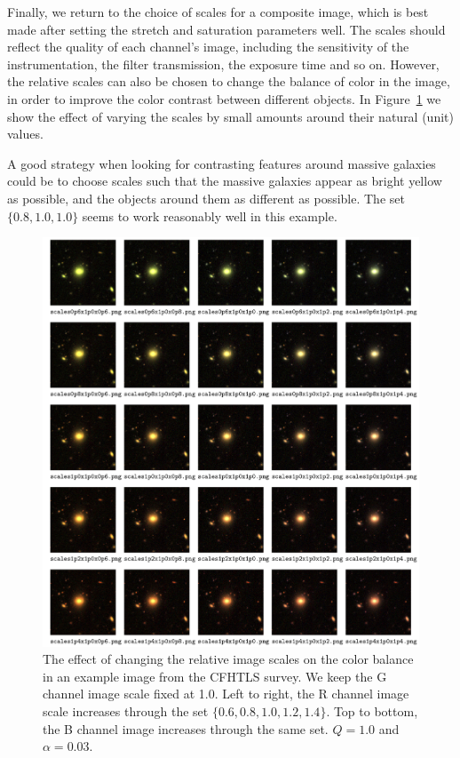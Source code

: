 \documentclass[letterpaper, 11pt]{article}
\begin{document}
Finally, we return to the choice of scales for a composite image, which is
best made after setting the stretch and saturation parameters well. The
scales should reflect the quality of each channel's image, including
the sensitivity of the instrumentation, the filter transmission, the exposure
time and so on. However, the relative scales can also be chosen to change the
balance of color in the image, in order to improve the color contrast between
different objects. In Figure~\ref{fig:color} we show the effect of varying the
scales by small amounts around their natural (unit) values.

A good strategy when looking for contrasting features around massive galaxies
could be to choose scales such that the massive galaxies appear as bright
yellow as possible, and the objects around them as different as possible. The
set $\{0.8,1.0,1.0\}$ seems to work reasonably well in this example.

\begin{figure}
\centering\includegraphics[width=0.9\linewidth]{Images/CFHTLS_27_scales_gallery.png}
\caption{The effect of changing the relative image scales on the color balance
in an example image from the CFHTLS survey. We keep the G channel image scale
fixed at 1.0. Left to right, the R channel image scale increases through the
set $\{0.6,0.8,1.0,1.2,1.4\}$. Top to bottom, the B channel image increases
through the same set. $Q=1.0$ and $\alpha = 0.03$.}
\label{fig:color}
\end{figure}
\end{document}
